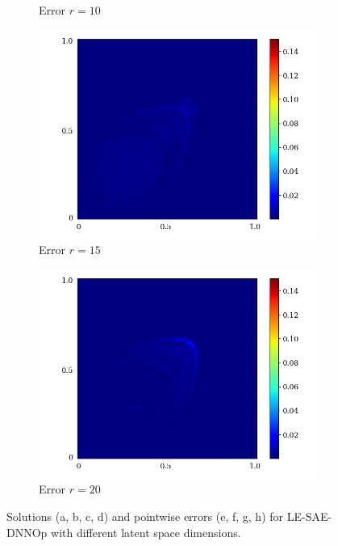 \begin{figure}[ht!]
\begin{center}
\begin{subfigure}[b]{0.20\textwidth}
\begin{center}
            \end{center}
            \caption{Error $r = 10$}
        \end{subfigure}   
        \begin{subfigure}[b]{0.20\textwidth}
            \begin{center}
                \includegraphics[trim = {0, 0, 3cm, 0}, clip, width=\textwidth]{Pictures/X-rom-LE-SAE-15-abs-err.png}
            \end{center}
            \caption{Error $r = 15$}
        \end{subfigure}    
        \begin{subfigure}[b]{0.20\textwidth}
            \begin{center}
                \includegraphics[trim = {0, 0, 3cm, 0}, clip, width=\textwidth]{Pictures/X-rom-LE-SAE-20-abs-err.png}
            \end{center}
            \caption{Error $r = 20$}
        \end{subfigure}
     \end{center}
     \caption[Solutions and pointwise errors for LE-SAE-DNNOp.]{Solutions (a, b, c, d) and pointwise errors (e, f, g, h) for LE-SAE-DNNOp with different latent space dimensions.}
        \label{fig: lesae-burger}
\end{figure}


